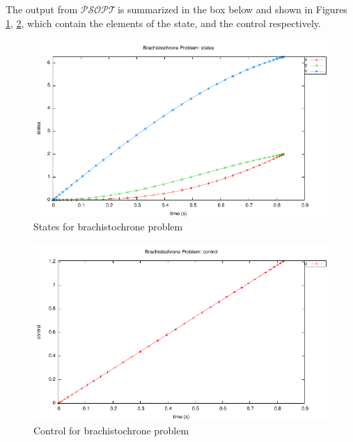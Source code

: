 \documentclass[a4paper,11pt]{report}    %
\newcommand{\psopt}{$\mathcal{PSOPT}$\,}  %
\newenvironment{shadedframe}{%
  \def\FrameCommand{\fcolorbox{black}{shadecolor}}%
  \MakeFramed {\FrameRestore}}
{\endMakeFramed}
\begin{document}
\tiny
\begin{shadedframe}

\end{shadedframe}
\normalsize

The output from \psopt is summarized in the box below and shown in Figures \ref{brac1_states}, \ref{brac1_control}, which contain the elements
of the state, and the control respectively.

\begin{shadedframe}

\end{shadedframe}

\begin{figure}
  \centering
  \includegraphics{../examples/brac1/brac1_states.pdf}
  \caption{States for brachistochrone problem}
  \label{brac1_states}
\end{figure}


\begin{figure}
  \centering
  \includegraphics{../examples/brac1/brac1_control}
  \caption{Control for brachistochrone problem} 
  \label{brac1_control}
\end{figure}
\end{document}
